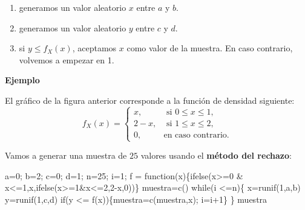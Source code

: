 \documentclass[
  letterpaper,
  DIV=11,
  numbers=noendperiod]{scrreprt}
\newenvironment{Shaded}{\begin{snugshade}}{\end{snugshade}}
\newcommand{\ControlFlowTok}[1]{\textcolor[rgb]{0.00,0.23,0.31}{#1}}
\newcommand{\DecValTok}[1]{\textcolor[rgb]{0.68,0.00,0.00}{#1}}
\newcommand{\FunctionTok}[1]{\textcolor[rgb]{0.28,0.35,0.67}{#1}}
\newcommand{\NormalTok}[1]{\textcolor[rgb]{0.00,0.23,0.31}{#1}}
\newcommand{\OtherTok}[1]{\textcolor[rgb]{0.00,0.23,0.31}{#1}}
\newcommand{\SpecialCharTok}[1]{\textcolor[rgb]{0.37,0.37,0.37}{#1}}
\begin{document}
\begin{enumerate}
\def\labelenumi{\arabic{enumi})}
\item
  generamos un valor aleatorio \(x\) entre \(a\) y \(b\).
\item
  generamos un valor aleatorio \(y\) entre \(c\) y \(d\).
\item
  si \(y\leq f_X(x)\), aceptamos \(x\) como valor de la muestra. En caso
  contrario, volvemos a empezar en 1.
\end{enumerate}

\textbf{Ejemplo}

El gráfico de la figura anterior corresponde a la función de densidad
siguiente: \[
f_X(x)=\begin{cases}
x, & \mbox{ si }0\leq x\leq 1,\\
2-x, & \mbox{ si }1\leq x\leq 2,\\
0, & \mbox{en caso contrario.}
\end{cases}
\]

Vamos a generar una muestra de \(25\) valores usando el \textbf{método
del rechazo}:

\begin{Shaded}
\begin{Highlighting}[]
\NormalTok{a}\OtherTok{=}\DecValTok{0}\NormalTok{; b}\OtherTok{=}\DecValTok{2}\NormalTok{; c}\OtherTok{=}\DecValTok{0}\NormalTok{; d}\OtherTok{=}\DecValTok{1}\NormalTok{; n}\OtherTok{=}\DecValTok{25}\NormalTok{; i}\OtherTok{=}\DecValTok{1}\NormalTok{;}
\NormalTok{f }\OtherTok{=} \ControlFlowTok{function}\NormalTok{(x)\{}\FunctionTok{ifelse}\NormalTok{(x}\SpecialCharTok{\textgreater{}=}\DecValTok{0} \SpecialCharTok{\&}\NormalTok{ x}\SpecialCharTok{\textless{}=}\DecValTok{1}\NormalTok{,x,}\FunctionTok{ifelse}\NormalTok{(x}\SpecialCharTok{\textgreater{}=}\DecValTok{1}\SpecialCharTok{\&}\NormalTok{x}\SpecialCharTok{\textless{}=}\DecValTok{2}\NormalTok{,}\DecValTok{2}\SpecialCharTok{{-}}\NormalTok{x,}\DecValTok{0}\NormalTok{))\}}
\NormalTok{muestra}\OtherTok{=}\FunctionTok{c}\NormalTok{()}
\ControlFlowTok{while}\NormalTok{(i }\SpecialCharTok{\textless{}=}\NormalTok{n)\{}
\NormalTok{  x}\OtherTok{=}\FunctionTok{runif}\NormalTok{(}\DecValTok{1}\NormalTok{,a,b)}
\NormalTok{  y}\OtherTok{=}\FunctionTok{runif}\NormalTok{(}\DecValTok{1}\NormalTok{,c,d)}
  \ControlFlowTok{if}\NormalTok{(y }\SpecialCharTok{\textless{}=} \FunctionTok{f}\NormalTok{(x))\{muestra}\OtherTok{=}\FunctionTok{c}\NormalTok{(muestra,x); i}\OtherTok{=}\NormalTok{i}\SpecialCharTok{+}\DecValTok{1}\NormalTok{\}}
\NormalTok{\}}
\NormalTok{muestra}
\end{Highlighting}
\end{Shaded}
\end{document}
